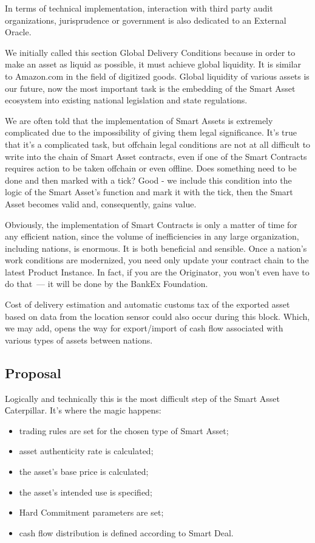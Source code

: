 \documentclass{article}
\begin{document}
\begin{multicols}{2}
In terms of technical implementation, interaction with third party audit organizations, jurisprudence or government is also dedicated to an External Oracle.

We initially called this section Global Delivery Conditions because in order to make an asset as liquid as possible, it must achieve global liquidity. It is similar to Amazon.com in the field of digitized goods. Global liquidity of various assets is our future, now the most important task is the embedding of the Smart Asset ecosystem into existing national legislation and state regulations. 

We are often told that the implementation of Smart Assets is extremely complicated due to the impossibility of giving them legal significance. It’s true that it’s a complicated task, but offchain legal conditions are not at all difficult to write into the chain of Smart Asset contracts, even if one of the Smart Contracts requires action to be taken offchain or even offline. Does something need to be done and then marked with a tick? Good - we include this condition into the logic of the Smart Asset’s function and mark it with the tick, then the Smart Asset becomes valid and, consequently, gains value. 

Obviously, the implementation of Smart Contracts is only a matter of time for any efficient nation, since the volume of inefficiencies in any large organization, including nations, is enormous. It is both beneficial and sensible. Once a nation’s work conditions are modernized, you need only update your contract chain to the latest Product Instance. In fact, if you are the Originator, you won’t even have to do that~--- it will be done by the BankEx Foundation. 

Cost of delivery estimation and automatic customs tax of the exported asset based on data from the location sensor could also occur during this block. Which, we may add, opens the way for export/import of cash flow associated with various types of assets between nations. 

\subsection{Proposal}

Logically and technically this is the most difficult step of the Smart Asset Сaterpillar. 
It’s where the magic happens:

\begin{itemize}
\item trading rules are set for the chosen type of Smart Asset;
\item asset authenticity rate is calculated;
\item the asset's base price is calculated;
\item the asset's intended use is specified;
\item Hard Commitment parameters are set;
\item cash flow distribution is defined according to Smart Deal.
\end{itemize}


\end{multicols}
\end{document}
